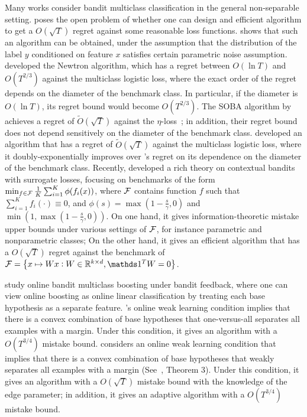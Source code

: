 Many works consider bandit multiclass classification in the general non-separable setting.
\cite{Abernethy-Rakhlin-2009} poses the open problem of whether one can design
and efficient algorithm to get a $O(\sqrt{T})$ regret against some reasonable loss functions.
\cite{Crammer-Gentile-2013} shows that such an algorithm can be obtained, under the assumption that the distribution of the label $y$ conditioned on feature $x$ satisfies certain parametric noise assumption.
\cite{Hazan-Kale-2011} developed the Newtron algorithm, which has a regret
between $O(\ln T)$ and $O(T^{2/3})$ against the multiclass logistic loss, where the exact order of the regret depends on the diameter of the benchmark class. In particular, if the diameter is $O(\ln T)$, its regret bound would become
$O(T^{2/3})$.
The SOBA algorithm by \cite{Beygelzimer-Orabona-Zhang-2017} achieves a regret of $\tilde{O}(\sqrt{T})$ against the $\eta$-loss~\cite{Orabona-Cesa-Bianchi-Gentile-2012}; in addition, their regret bound does not depend sensitively on the diameter of the benchmark class.
\cite{Foster-Kale-Luo-Mohri-Sridharan-2018} developed an algorithm that has a regret of $\tilde{O}(\sqrt{T})$ against the multiclass logistic loss, where it doubly-exponentially improves over \cite{Hazan-Kale-2011}'s regret on its dependence on the diameter of the benchmark class.
Recently, \cite{Foster-Krishnamurthy-2018} developed a rich theory on contextual bandits with surrogate losses, focusing on benchmarks of the form $\min_{f \in \mathcal{F}} \frac 1 K \sum_{i=1}^K \phi( f_i(x) )$, where $\mathcal{F}$ contains function $f$ such that $\sum_{i=1}^K f_i(\cdot) \equiv 0$,
and $\phi(s) = \max(1 - \frac s \gamma, 0)$ and $\min(1, \max(1 - \frac s \gamma, 0))$.
On one hand, it gives information-theoretic mistake upper bounds under various settings of $\mathcal{F}$, for instance parametric and nonparametric classes; On the other hand, it gives an efficient algorithm that has a $O(\sqrt{T})$ regret against the benchmark of $\calF = \cbr{x \mapsto W x: W \in \R^{k \times d}, \one^T W = 0}$.

\cite{Chen-Lin-Lu-2014, Zhang-Jung-Tewari-2018} study online bandit multiclass boosting under bandit feedback, where one can view online boosting as online linear classification by treating each base hypothesis as a separate feature.
\cite{Chen-Lin-Lu-2014}'s online weak learning condition implies that there is a convex combination of base hypotheses that one-versus-all separates all examples with a margin. Under this condition, it gives an algorithm with a $O(T^{3/4})$ mistake bound.
\cite{Zhang-Jung-Tewari-2018} considers an online weak learning condition that implies that there is a convex combination of base hypotheses that weakly separates all examples with a margin (See~\cite{Mukherjee-Schapire-2013}, Theorem 3). Under this condition, it gives an algorithm with a $O(\sqrt{T})$ mistake bound with the knowledge of the edge parameter; in addition, it gives an adaptive algorithm with a $O(T^{3/4})$ mistake bound.


